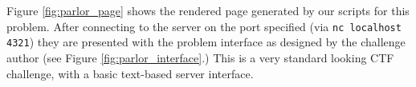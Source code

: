 Figure \ref{fig:parlor_page} shows the rendered page generated by our
scripts for this problem. After connecting to the server on the port
specified (via \texttt{nc localhost 4321}) they are presented with the
problem interface as designed by the challenge author (see Figure
\ref{fig:parlor_interface}.) This is a very standard looking CTF
challenge, with a basic text-based server interface.
